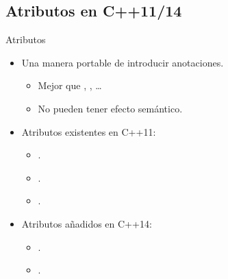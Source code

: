 \subsection{Atributos en C++11/14}

\begin{frame}[t,fragile]{Atributos}
\begin{itemize}
  \item Una manera portable de introducir anotaciones.
    \begin{itemize}
      \item Mejor que , , \ldots
      \item No pueden tener efecto semántico.
    \end{itemize}
  \vfill\pause
  \item Atributos existentes en C++11:
    \begin{itemize}
      \item \cppid{[[noreturn]]}.
      \item {}.
      \item {}.
    \end{itemize}
  \vfill\pause
  \item Atributos añadidos en C++14:
    \begin{itemize}
      \item \cppid{[[deprecated]]}.
      \item {}.
    \end{itemize}
\end{itemize}
\end{frame}
